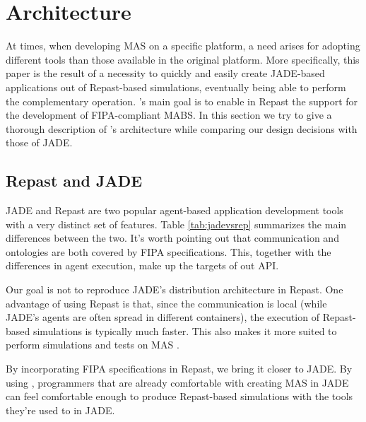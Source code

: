 \section{\apiname{} Architecture} %
\label{sec:proposal}

At times, when developing MAS on a specific platform, a need arises for adopting different tools than those available in the original platform. More specifically, this paper is the result of a necessity to quickly and easily create JADE-based applications out of Repast-based simulations, eventually being able to perform the complementary operation. \apiname{}'s main goal is to enable in Repast the support for the development of FIPA-compliant MABS. In this section we try to give a thorough description of \apiname{}'s architecture while comparing our design decisions with those of JADE.

\subsection{Repast and JADE}
JADE and Repast are two popular agent-based application development tools with a very distinct set of features. Table \ref{tab:jadevsrep} summarizes the main differences between the two. It's worth pointing out that communication and ontologies are both covered by FIPA specifications. This, together with the differences in agent execution, make up the targets of out API.

Our goal is not to reproduce JADE's distribution architecture in Repast. One advantage of using Repast is that, since the communication is local (while JADE's agents are often spread in different containers), the execution of Repast-based simulations is typically much faster. This also makes it more suited to perform simulations and tests on MAS \cite{mengistu2008scalability} \cite{gormer2011jrep} \cite{garcia2011misia}.

By incorporating FIPA specifications in Repast, we bring it closer to JADE. By using \apiname{}, programmers that are already comfortable with creating MAS in JADE can feel comfortable enough to produce Repast-based simulations with the tools they're used to in JADE.


